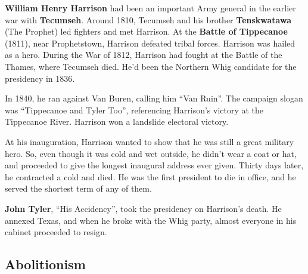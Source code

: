 \textbf{William Henry Harrison} had been an important Army general in the earlier war with \textbf{Tecumseh}.
Around 1810, Tecumseh and his brother \textbf{Tenskwatawa} (The Prophet) led fighters and met Harrison.
At the \textbf{Battle of Tippecanoe} (1811), near Prophetstown, Harrison defeated tribal forces.
Harrison was hailed as a hero.
During the War of 1812, Harrison had fought at the Battle of the Thames, where Tecumseh died.
He'd been the Northern Whig candidate for the presidency in 1836.

In 1840, he ran against Van Buren, calling him ``Van Ruin''.
The campaign slogan was ``Tippecanoe and Tyler Too'', referencing Harrison's victory at the Tippecanoe River.
Harrison won a landslide electoral victory.

At his inauguration, Harrison wanted to show that he was still a great military hero.
So, even though it was cold and wet outside, he didn't wear a coat or hat,
and proceeded to give the longest inaugural address ever given.
Thirty days later, he contracted a cold and died.
He was the first president to die in office, and he served the shortest term of any of them.

\textbf{John Tyler}, ``His Accidency'', took the presidency on Harrison's death.
He annexed Texas, and when he broke with the Whig party, almost everyone in his cabinet proceeded to resign.

\subsection*{Abolitionism}


